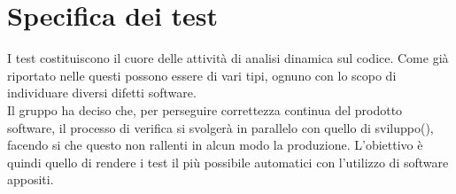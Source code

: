 \section{Specifica dei test}
I test costituiscono il cuore delle attività di analisi dinamica sul codice. Come già riportato nelle \NdPv{} questi possono essere di vari tipi, ognuno con lo scopo di individuare diversi difetti software. \\
Il gruppo \Gruppo{} ha deciso che, per perseguire correttezza continua del prodotto software, il processo di verifica si svolgerà in parallelo con quello di sviluppo(), facendo si che questo non rallenti in alcun modo la produzione. L'obiettivo è quindi quello di rendere i test il più possibile automatici con l'utilizzo di software appositi. 







